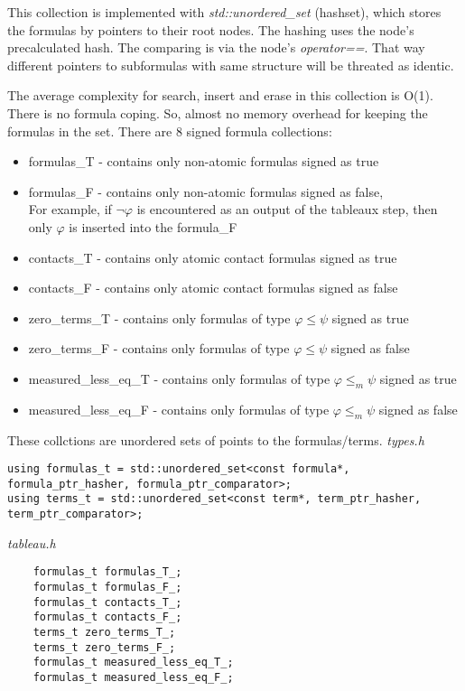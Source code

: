 \documentclass{article}
\begin{document}
	This collection is implemented with \textit{std::unordered\_set} (hashset), which stores the formulas by pointers to their root nodes. The hashing uses the node's precalculated hash. The comparing is via the node's \textit{operator==}. That way different pointers to subformulas with same structure will be threated as identic.

	The average complexity for search, insert and erase in this collection is O(1). There is no formula coping. So, almost no memory overhead for keeping the formulas in the set.
	\newline
	\newline
	There are 8 signed formula collections:
	\begin{itemize}
		\item formulas\_T - contains only non-atomic formulas signed as true
		\item formulas\_F - contains only non-atomic formulas signed as false, \\
				For example, if $\neg\varphi$ is encountered as an output of the tableaux step, then only $\varphi$ is inserted into the formula\_F
		\item contacts\_T - contains only atomic contact formulas signed as true
		\item contacts\_F - contains only atomic contact formulas signed as false
		\item zero\_terms\_T - contains only formulas of type $\varphi \le \psi$ signed as true
		\item zero\_terms\_F - contains only formulas of type $\varphi \le \psi$ signed as false
		\item measured\_less\_eq\_T - contains only formulas of type $\varphi \le_m \psi$ signed as true
		\item measured\_less\_eq\_F - contains only formulas of type $\varphi \le_m \psi$ signed as false
	\end{itemize}

	These collctions are unordered sets of points to the formulas/terms.
\noindent
\textit{types.h}
\begin{lstlisting}
using formulas_t = std::unordered_set<const formula*, formula_ptr_hasher, formula_ptr_comparator>;
using terms_t = std::unordered_set<const term*, term_ptr_hasher, term_ptr_comparator>;
\end{lstlisting}

\noindent
\textit{tableau.h}
\begin{lstlisting}
    formulas_t formulas_T_;
    formulas_t formulas_F_;
    formulas_t contacts_T_;
    formulas_t contacts_F_;
    terms_t zero_terms_T_;
    terms_t zero_terms_F_;
    formulas_t measured_less_eq_T_;
    formulas_t measured_less_eq_F_;
\end{lstlisting}
\end{document}
